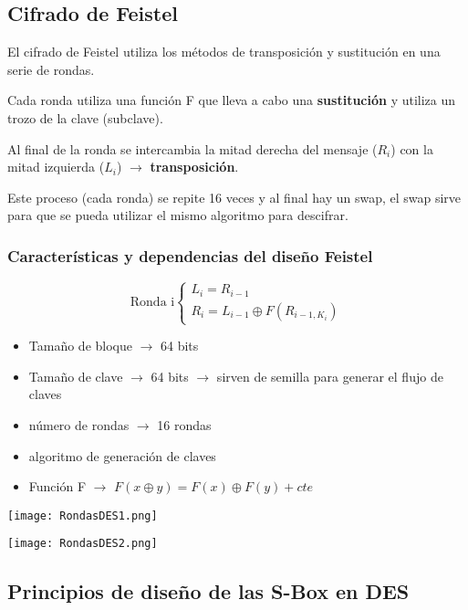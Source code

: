  \subsection{Cifrado de Feistel}
 
 El cifrado de Feistel utiliza los métodos de transposición y sustitución en una serie de rondas.
 
 Cada ronda utiliza una función F que lleva a cabo una \textbf{sustitución} y utiliza un trozo de la clave (subclave).
 
 Al final de la ronda se intercambia la mitad derecha del mensaje ($R_i$) con la mitad izquierda ($L_i$) $\rightarrow $ \textbf{transposición}.
 
 Este proceso (cada ronda) se repite 16 veces y al final hay un swap, el swap sirve para que se pueda utilizar el mismo algoritmo para descifrar.
 
 \subsubsection{Características y dependencias del diseño Feistel}
 $$\text{Ronda i}\begin{cases}
 L_i = R_{i-1}\\
 R_i = L_{i-1} \oplus F(R_{i-1, K_i})
 \end{cases} $$
 
 \begin{itemize}
 	\item Tamaño de bloque $\rightarrow$ 64 bits\\
 	\item Tamaño de clave $\rightarrow$ 64 bits $\rightarrow$ sirven de semilla para generar el flujo de claves\\
 	\item número de rondas $\rightarrow$ 16 rondas\\
 	\item algoritmo de generación de claves\\
 	\item Función F $\rightarrow$ $F(x \oplus y) = F(x) \oplus F(y) + cte$
 \end{itemize}
 
 
 \newpage
 \texttt{[image: RondasDES1.png]}
 
 \newpage
 \texttt{[image: RondasDES2.png]}
 
 \newpage

\subsection{Principios de diseño de las S-Box en DES}

